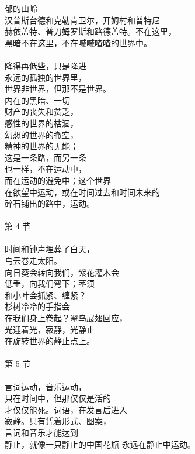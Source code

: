 \documentclass{article}
\begin{document}
郁的山岭 \\
汉普斯台德和克勒肯卫尔，开姆村和普特尼 \\
赫依盖特、普刀姆罗斯和路德盖特。不在这里， \\
黑暗不在这里，不在嘁嘁喳喳的世界中。 \\
 \\
降得再低些，只是降进 \\
永远的孤独的世界里， \\
世界非世界，但那不是世界。 \\
内在的黑暗、一切 \\
财产的丧失和贫乏， \\
感性的世界的枯涸， \\
幻想的世界的撤空， \\
精神的世界的无能； \\
这是一条路，而另一条 \\
也一样，不在运动中， \\
而在运动的避免中；这个世界 \\
在欲望中运动，或在时间过去和时间未来的 \\
碎石铺出的路中，运动。 \\
 \\
第 4 节 \\
 \\
时间和钟声埋葬了白天， \\
乌云卷走太阳。 \\
向日葵会转向我们，紫花灌木会 \\
低垂，向我们弯下；茎须 \\
和小叶会抓紧、缠紧？ \\
杉树冷冷的手指会 \\
在我们身上卷起？翠鸟展翅回应， \\
光迎着光，寂静，光静止 \\
在旋转世界的静止点上。 \\
 \\
第 5 节 \\
 \\
言词运动，音乐运动， \\
只在时间中，但那仅仅是活的 \\
才仅仅能死。词语，在发言后进入 \\
寂静。只有凭着形式、图案， \\
言词和音乐才能达到 \\
静止，就像一只静止的中国花瓶
永远在静止中运动。


\newpage 
\end{document}
